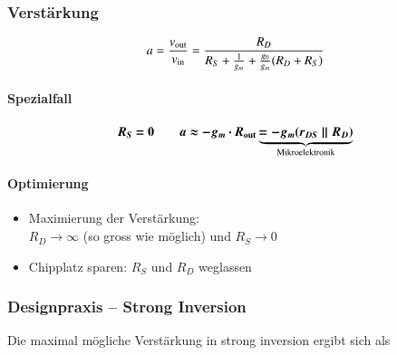 \begin{minipage}[t]{0.58\columnwidth}
    \subsubsection{Verstärkung}

    \vspace{-0.2cm}
    \[
        a = \frac{v_{\rm out}}{v_{\rm in}} = \frac{R_D}{R_S + \frac{1}{g_m} + \frac{g_0}{g_m}(R_D + R_S)} 
    \]


    \paragraph{Spezialfall}

    \vspace{-0.5cm}

    \[
        \boldsymbol{ R_S = 0 \qquad  a \approx - g_m \cdot R_{\rm out} \underbrace{= - g_m (r_{DS} \parallel R_D) }_{\text{Mikroelektronik}} }
    \]
    


    \vspace{-0.2cm}

    \paragraph{Optimierung}

    \begin{itemize}
        \item Maximierung der Verstärkung: \\
            $R_D \to \infty$ (so gross wie möglich) und $R_S \to 0$
        \item Chipplatz sparen: $R_S$ und $R_D$ weglassen
    \end{itemize}
\end{minipage}


\subsubsection{Designpraxis -- Strong Inversion}

Die \textbf{} maximal mögliche Verstärkung in strong inversion ergibt sich als

\vspace{-0.2cm}


